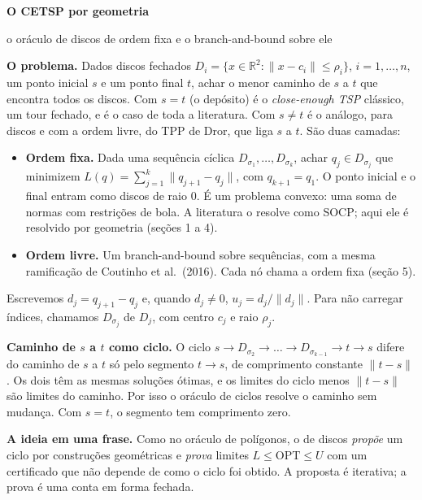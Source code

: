 \documentclass[11pt]{article}
\theoremstyle{plain}
\theoremstyle{remark}
\newcommand{\R}{\mathbb{R}}
\begin{document}
{\color{navy}\LARGE\bfseries O CETSP por geometria\par}
\vspace{2pt}
{\color{quiet}\large o oráculo de discos de ordem fixa e o branch-and-bound sobre ele\par}
\vspace{10pt}

\textbf{O problema.} Dados discos fechados $D_i=\{x\in\R^2:\lVert x-c_i\rVert\le\rho_i\}$,
$i=1,\dots,n$, um ponto inicial $s$ e um ponto final $t$, achar o menor caminho de $s$ a
$t$ que encontra todos os discos. Com $s=t$ (o depósito) é o \emph{close-enough TSP}
clássico, um tour fechado, e é o caso de toda a literatura. Com $s\neq t$ é o análogo,
para discos e com a ordem livre, do TPP de Dror, que liga $s$ a $t$. São duas camadas:
\begin{itemize}
  \item \textbf{Ordem fixa.} Dada uma sequência cíclica $D_{\sigma_1},\dots,D_{\sigma_k}$,
    achar $q_j\in D_{\sigma_j}$ que minimizem $L(q)=\sum_{j=1}^{k}\lVert q_{j+1}-q_j\rVert$, com
    $q_{k+1}=q_1$. O ponto inicial e o final entram como discos de raio $0$. É um problema
    convexo: uma soma de normas com restrições de bola. A literatura o resolve como SOCP;
    aqui ele é resolvido por geometria (seções 1 a 4).
  \item \textbf{Ordem livre.} Um branch-and-bound sobre sequências, com a mesma
    ramificação de Coutinho et al.~(2016). Cada nó chama a ordem fixa (seção 5).
\end{itemize}
Escrevemos $d_j=q_{j+1}-q_j$ e, quando $d_j\neq0$, $u_j=d_j/\lVert d_j\rVert$. Para não
carregar índices, chamamos $D_{\sigma_j}$ de $D_j$, com centro $c_j$ e raio $\rho_j$.

\textbf{Caminho de $s$ a $t$ como ciclo.} O ciclo
$s\to D_{\sigma_2}\to\dots\to D_{\sigma_{k-1}}\to t\to s$ difere do caminho de $s$ a $t$ só
pelo segmento $t\to s$, de comprimento constante $\lVert t-s\rVert$. Os dois têm as mesmas
soluções ótimas, e os limites do ciclo menos $\lVert t-s\rVert$ são limites do caminho. Por
isso o oráculo de ciclos resolve o caminho sem mudança. Com $s=t$, o segmento tem
comprimento zero.

\textbf{A ideia em uma frase.} Como no oráculo de polígonos, o de discos \emph{propõe} um
ciclo por construções geométricas e \emph{prova} limites $L\le\mathrm{OPT}\le U$ com um
certificado que não depende de como o ciclo foi obtido. A proposta é iterativa; a prova é
uma conta em forma fechada.
\end{document}
